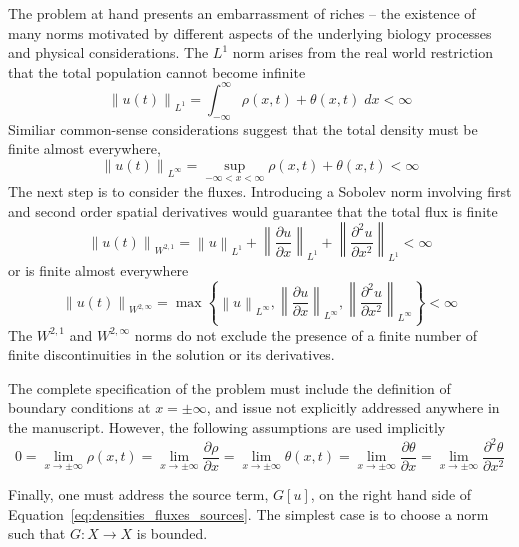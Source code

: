 \documentclass[12pt]{amsart}
\begin{document}
The problem at hand presents an embarrassment of riches -- the
existence of many norms motivated by different aspects of the
underlying biology processes and physical considerations.  The $L^{1}$
norm arises from the real world restriction that the total population
cannot become infinite
\begin{equation}
  \left\|u(t)\right\|_{L^{1}} = \int_{-\infty}^{\infty} \rho(x, t) +
  \theta(x, t) \; dx < \infty
\end{equation}
Similiar common-sense considerations suggest that the total density
must be finite almost everywhere,
\begin{equation}
  \left\|u(t)\right\|_{L^{\infty}} = \sup_{-\infty < x < \infty}
  \rho(x, t) + \theta(x, t) < \infty
\end{equation}
The next step is to consider the fluxes.  Introducing a Sobolev norm 
involving first and second order spatial derivatives
would guarantee that the total flux is finite
\begin{equation}
  \left\|u(t)\right\|_{W^{2,1}} = \left\|u\right\|_{L^{1}} + 
  \left\|\frac{\partial u}{\partial x}\right\|_{L^{1}} +
  \left\|\frac{\partial^2 u}{\partial x^2}\right\|_{L^{1}} < \infty  
\end{equation}
or is finite almost everywhere
\begin{equation}
  \left\|u(t)\right\|_{W^{2,\infty}} =
  \max\left\{\left\|u\right\|_{L^{\infty}}, 
  \left\|\frac{\partial u}{\partial x}\right\|_{L^{\infty}},
  \left\|\frac{\partial^2 u}{\partial
    x^2}\right\|_{L^{\infty}}\right\} < \infty
\end{equation}
The $W^{2, 1}$ and $W^{2, \infty}$ norms do not exclude the presence
of a finite number of finite discontinuities in the solution or its
derivatives.

The complete specification of the problem must include the
definition of boundary conditions at $x=\pm\infty$, and issue not
explicitly addressed anywhere in the manuscript.  However, the
following assumptions are used implicitly
\begin{equation}
  0 = 
  \lim_{x\rightarrow \pm\infty} \rho(x, t) =
  \lim_{x\rightarrow \pm\infty} \frac{\partial\rho}{\partial x} =  
  \lim_{x\rightarrow \pm\infty} \theta(x, t)  =  
  \lim_{x\rightarrow \pm\infty} \frac{\partial \theta}{\partial x} = 
  \lim_{x\rightarrow \pm\infty} \frac{\partial^2 \theta}{\partial x^2}
  \label{eq:boundary_conditions}
\end{equation}


Finally, one must address the source term, $G\left[u\right]$, on the
right hand side of Equation~\ref{eq:densities_fluxes_sources}.  The
simplest case is to choose a norm such that $G: X \rightarrow X$ is
bounded.  
\end{document}
